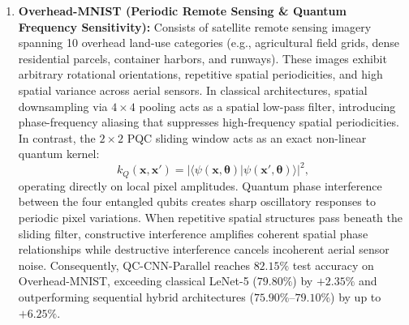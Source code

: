 \documentclass[pdflatex,sn-mathphys-num]{sn-jnl}%
\theoremstyle{thmstyleone}%
\theoremstyle{thmstyletwo}%
\theoremstyle{thmstylethree}%
\begin{document}
\begin{enumerate}
    \item \textbf{Overhead-MNIST (Periodic Remote Sensing \& Quantum Frequency Sensitivity):} 
    Consists of satellite remote sensing imagery spanning 10 overhead land-use categories (e.g., agricultural field grids, dense residential parcels, container harbors, and runways). These images exhibit arbitrary rotational orientations, repetitive spatial periodicities, and high spatial variance across aerial sensors. In classical architectures, spatial downsampling via $4 \times 4$ pooling acts as a spatial low-pass filter, introducing phase-frequency aliasing that suppresses high-frequency spatial periodicities.
    In contrast, the $2 \times 2$ PQC sliding window acts as an exact non-linear quantum kernel:
    \begin{equation}
    k_Q(\mathbf{x}, \mathbf{x}') = |\langle \psi(\mathbf{x}, \boldsymbol{\theta}) | \psi(\mathbf{x}', \boldsymbol{\theta}) \rangle|^2,
    \label{eq:quantum_kernel_overlap}
    \end{equation}
    operating directly on local pixel amplitudes. Quantum phase interference between the four entangled qubits creates sharp oscillatory responses to periodic pixel variations. When repetitive spatial structures pass beneath the sliding filter, constructive interference amplifies coherent spatial phase relationships while destructive interference cancels incoherent aerial sensor noise. Consequently, QC-CNN-Parallel reaches $82.15\%$ test accuracy on Overhead-MNIST, exceeding classical LeNet-5 ($79.80\%$) by $+2.35\%$ and outperforming sequential hybrid architectures ($75.90\%$--$79.10\%$) by up to $+6.25\%$.
\end{enumerate}
\end{document}
